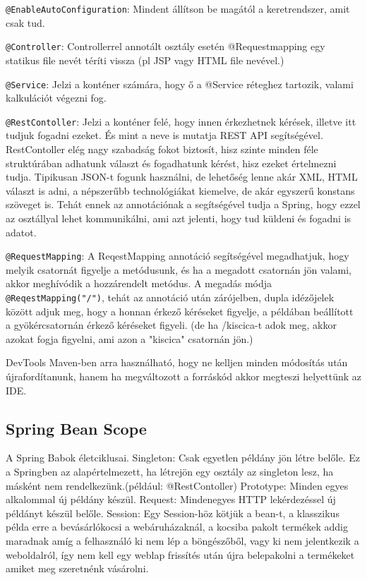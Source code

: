 \documentclass[11pt]{article}
\begin{document}
\texttt{@EnableAutoConfiguration}: Mindent állítson be magától a keretrendszer, amit csak tud.

\texttt{@Controller}: Controllerrel annotált osztály esetén @Requestmapping egy statikus file nevét téríti vissza (pl JSP vagy HTML file nevével.)

\texttt{@Service}: Jelzi a konténer számára, hogy ő a @Service réteghez tartozik, valami kalkulációt végezni fog.

\texttt{@RestContoller}:
Jelzi a konténer felé, hogy innen érkezhetnek kérések, illetve itt tudjuk fogadni ezeket. És mint a neve is mutatja REST API segítségével. RestContoller elég nagy szabadság fokot biztosít, hisz szinte minden féle struktúrában adhatunk választ és fogadhatunk kérést, hisz ezeket értelmezni tudja. Tipikusan JSON-t fogunk használni, de lehetőség lenne akár XML, HTML választ is adni, a népszerűbb technológiákat kiemelve, de akár egyszerű konstans szöveget is. Tehát ennek az annotációnak a segítségével tudja a Spring, hogy ezzel az osztállyal lehet kommunikálni, ami azt jelenti, hogy tud küldeni és fogadni is adatot.

\texttt{@RequestMapping}:
A ReqestMapping annotáció segítségével megadhatjuk, hogy melyik csatornát figyelje a metódusunk, és ha a megadott csatornán jön valami, akkor meghívódik a hozzárendelt metódus.  A megadás módja \texttt{@ReqestMapping("/")}, tehát az annotáció után zárójelben, dupla idézőjelek között adjuk meg, hogy a honnan érkező kéréseket figyelje, a példában beállított a gyökércsatornán érkező kéréseket figyeli. (de ha /kiscica-t adok meg, akkor azokat fogja figyelni, ami azon a "kiscica" csatornán jön.)

DevTools Maven-ben arra használható, hogy ne kelljen minden módosítás után újrafordítanunk, hanem ha megváltozott a forráskód akkor megteszi helyettünk az IDE.

\subsection{Spring Bean Scope}

A Spring Babok életciklusai.
Singleton: Csak egyetlen példány jön létre belőle. Ez a Springben az alapértelmezett, ha létrejön egy osztály az singleton lesz, ha másként nem rendelkezünk.(például: @RestContoller)
Prototype: Minden egyes alkalommal új példány készül.
Request: Mindenegyes HTTP lekérdezéssel új példányt készül belőle.
Session: Egy Session-höz kötjük a bean-t, a klasszikus példa erre a bevásárlókocsi a webáruházaknál, a kocsiba pakolt termékek addig maradnak amíg a felhasználó ki nem lép a böngészőből, vagy ki nem jelentkezik a weboldalról, így nem kell egy weblap frissítés után újra belepakolni a termékeket amiket meg szeretnénk vásárolni.
\end{document}
